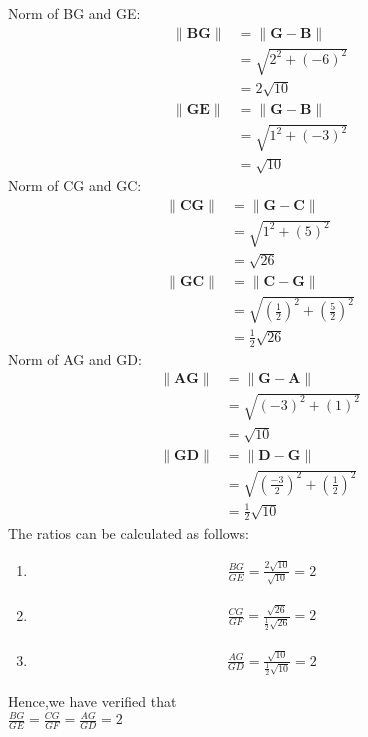 \documentclass[journal,12pt,onecolumn]{IEEEtran}
\theoremstyle{remark}
\begin{document}
Norm of BG and GE:
\begin{align}
\|\mathbf{BG}\|&=\|\mathbf{G-B}\|\\
               &=\sqrt{2^2+(-6)^2}\\
               &=2\sqrt{10}\\
\|\mathbf{GE}\|&=\|\mathbf{G-B}\|\\
               &=\sqrt{1^2+(-3)^2}\\
               &=\sqrt{10}
\end{align}
Norm of CG and GC:\\
\begin{align}
\|\mathbf{CG}\|&=\|\mathbf{G-C}\|\\
               &=\sqrt{1^2+(5)^2}\\
               &=\sqrt{26}\\
\|\mathbf{GC}\|&=\|\mathbf{C-G}\|\\
               &=\sqrt{\left(\frac{1}{2}\right)^2+\left(\frac{5}{2}\right)^2}\\
               &=\frac{1}{2}\sqrt{26}
\end{align}
Norm of AG and GD:\\
\begin{align}
\|\mathbf{AG}\|&=\|\mathbf{G-A}\|\\
               &=\sqrt{(-3)^2+(1)^2}\\
               &=\sqrt{10}\\
\|\mathbf{GD}\|&=\|\mathbf{D-G}\|\\
               &=\sqrt{\left(\frac{-3}{2}\right)^2+\left(\frac{1}{2}\right)^2}\\
               &=\frac{1}{2}\sqrt{10}
\end{align}
The ratios can be calculated as follows:\\
\begin{enumerate} 
\item
\begin{align}
\frac{BG}{GE} =\frac{2\sqrt{10}}{\sqrt{10}}=2
\end{align}
\item 
\begin{align}
\frac{CG}{GF}=\frac{\sqrt{26}}{\frac{1}{2}\sqrt{26}}=2
\end{align}
\item 
\begin{align}
\frac{AG}{GD}=\frac{\sqrt{10}}{\frac{1}{2}\sqrt{10}}=2
\end{align}
\end{enumerate}
Hence,we have verified that \\
$\frac{BG}{GE}=\frac{CG}{GF}=\frac{AG}{GD}=2$
\end{document}
